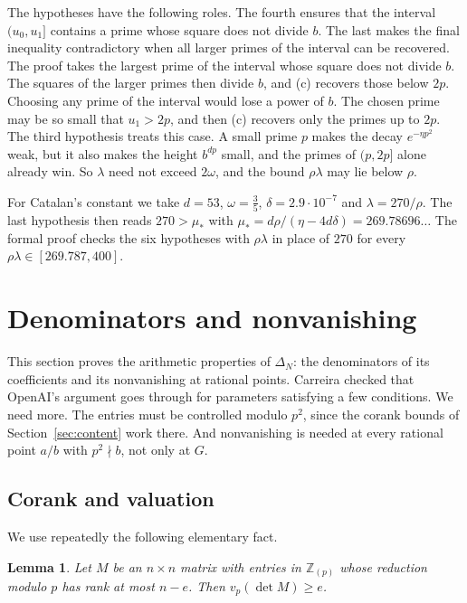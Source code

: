 \documentclass[11pt]{amsart}
\newcommand{\Mustar}{269.78696}
\newtheorem{lemma}[theorem]{Lemma}
\theoremstyle{definition}
\theoremstyle{remark}
\numberwithin{equation}{section}
\newcommand{\Z}{\mathbb Z}
\begin{document}
The hypotheses have the following roles. The fourth ensures that the interval $(u_0,u_1]$ contains a prime
whose square does not divide $b$. The last makes the final inequality contradictory when all larger primes
of the interval can be recovered. The proof takes the largest prime of the interval whose square does not
divide $b$. The squares of the larger primes then divide $b$, and (c) recovers those below $2p$. Choosing
any prime of the interval would lose a power of $b$. The chosen prime may be so small that $u_1>2p$, and then
(c) recovers only the primes up to $2p$. The third hypothesis treats this case. A small prime $p$ makes the
decay $e^{-\eta p^2}$ weak, but it also makes the height $b^{dp}$ small, and the primes of $(p,2p]$ alone
already win. So $\lambda$ need not exceed $2\omega$, and the bound $\rho\lambda$ may lie below $\rho$.

For Catalan's constant we take $d=53$, $\omega=\frac35$, $\delta=2.9\cdot10^{-7}$ and $\lambda=270/\rho$.
The last hypothesis then reads $270>\mu_*$ with $\mu_*=d\rho/(\eta-4d\delta)=\Mustar\ldots$ The formal proof
checks the six hypotheses with $\rho\lambda$ in place of $270$ for every $\rho\lambda\in[269.787,400]$.

\section{Denominators and nonvanishing}\label{sec:setup}

This section proves the arithmetic properties of $\Delta_N$: the denominators of its coefficients and its
nonvanishing at rational points. Carreira \cite{Carreira2026} checked that OpenAI's argument goes through
for parameters satisfying a few conditions. We need more. The entries must be controlled modulo $p^2$,
since the corank bounds of Section~\ref{sec:content} work there. And nonvanishing is needed at every
rational point $a/b$ with $p^2\nmid b$, not only at $G$.

\subsection{Corank and valuation}
We use repeatedly the following elementary fact.

\begin{lemma}\label{lem:rank-valuation}
Let $M$ be an $n\times n$ matrix with entries in $\Z_{(p)}$ whose reduction modulo $p$ has rank at most
$n-e$. Then $v_p(\det M)\ge e$.
\end{lemma}
\end{document}
